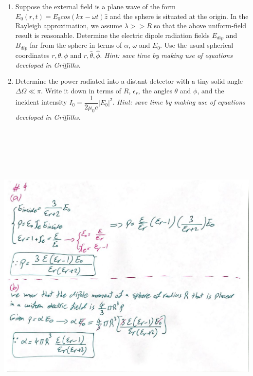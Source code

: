 \documentclass[fleqn]{article}
\begin{document}
\begin{enumerate}
\begin{enumerate}
      \item Suppose the external field is a plane wave of the form $E_0(r,t)=E_0 cos(kx-\omega t) \hat{z}$ and the
      sphere is situated at the origin. In the Rayleigh approximation, we assume $\lambda >> R$ so that the
      above uniform-field result is reasonable. Determine the electric dipole radiation fields $E_{dip}$ and
      $B_{dip}$ far from the sphere in terms of $\alpha$, $\omega$ and $E_0$. Use the usual spherical coordinates 
      $r, \theta, \phi$ and $\hat{r}, \hat{\theta}, \hat{\phi}$. 
      \emph{Hint: save time by making use of equations developed in Griffiths.}

      \item Determine the power radiated into a distant detector with a tiny solid angle $\Delta \Omega ≪ \pi$. 
      Write it down in terms of $R$, $\epsilon_r$, the angles $\theta$ and $\phi$, and the incident intensity 
      $I_0=\dfrac{1}{2 \mu_0 c}|E_0|^2$. \emph{Hint: save time by making use of equations developed in Griffiths.}
    \end{enumerate}

    \begin{center}
      \includegraphics[height=16cm, width=17cm]{4A.JPG}
    \end{center}


\end{enumerate}
\end{document}

